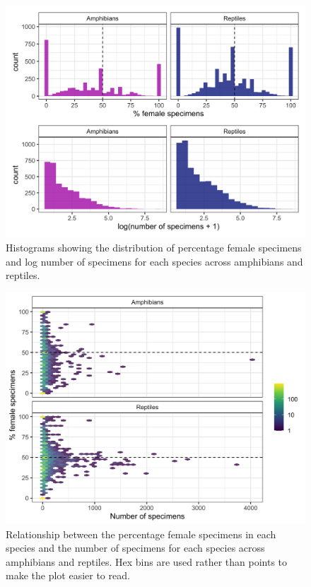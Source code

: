 \documentclass[a4paper, 12pt]{article}
\begin{document}
\begin{figure}[H]
 \centering
  \includegraphics[width = \linewidth]{figures/histogram-specimen-counts.png}
  \caption{Histograms showing the distribution of percentage female specimens and log number of specimens for each species across amphibians and reptiles.}
  \label{fig-histograms}
\end{figure}

\begin{figure}[H]
 \centering
  \includegraphics[width = \linewidth]{figures/specimens-numbers-all.png}
  \caption{Relationship between the percentage female specimens in each species and the number of specimens for each species across amphibians and reptiles. 
  Hex bins are used rather than points to make the plot easier to read.}
  \label{fig-hex}
\end{figure}
\end{document}
